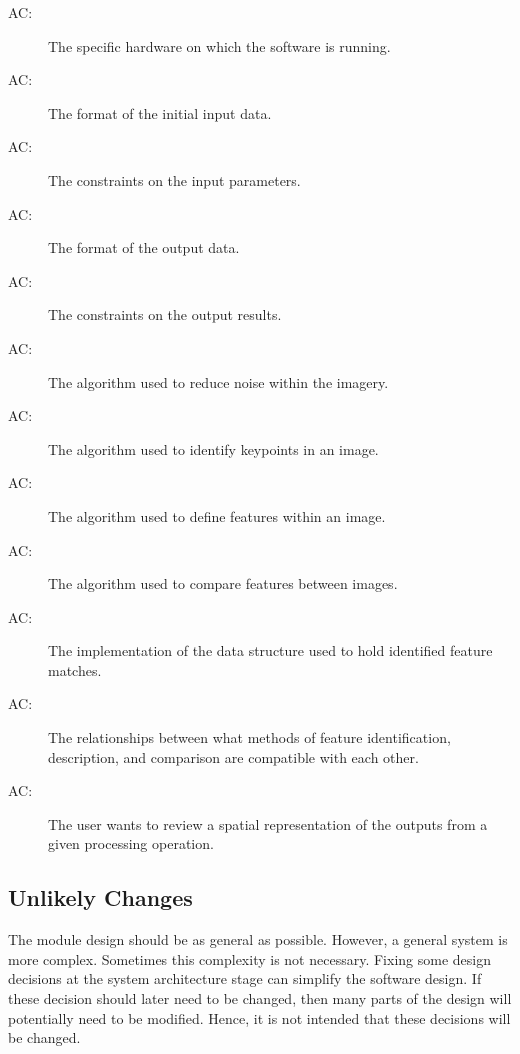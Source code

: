 \documentclass[12pt, titlepage]{article}
\newcounter{acnum}
\newcommand{\actheacnum}{AC\theacnum}
\begin{document}
\begin{description}
\item[ \actheacnum \label{acHardware}:] The specific
  hardware on which the software is running.
\item[ \actheacnum \label{acInput}:] The format of the
  initial input data.
\item[ \actheacnum \label{acInConstrain}:] The constraints 
on the input parameters.
\item[ \actheacnum \label{acOutput}:] The format of the 
output data.
\item[ \actheacnum \label{acOutConstrain}:] The constraints on the output results.
\item[ \actheacnum \label{acNoise}:] The algorithm used to 
reduce noise within the imagery.
\item[ \actheacnum \label{acKP}:] The algorithm used to 
identify keypoints in an image.
\item[ \actheacnum \label{acFD}:] The algorithm used to 
define features within an image.
\item[ \actheacnum \label{acFM}:] The algorithm used to 
compare features between images.
\item[ \actheacnum \label{acMatches}:] The implementation 
of the data structure used to hold identified feature matches.
\item[ \actheacnum \label{acRelation}:] The relationships 
between what methods of feature identification, description, and comparison are 
compatible with each other.
\item[ \actheacnum \label{acVisualize}:] The user wants 
to review a spatial representation of the outputs from a given processing operation.
\end{description}

\subsection{Unlikely Changes} \label{SecUchange}

The module design should be as general as possible. However, a general system is
more complex. Sometimes this complexity is not necessary. Fixing some design
decisions at the system architecture stage can simplify the software design. If
these decision should later need to be changed, then many parts of the design
will potentially need to be modified. Hence, it is not intended that these
decisions will be changed.
\end{document}
